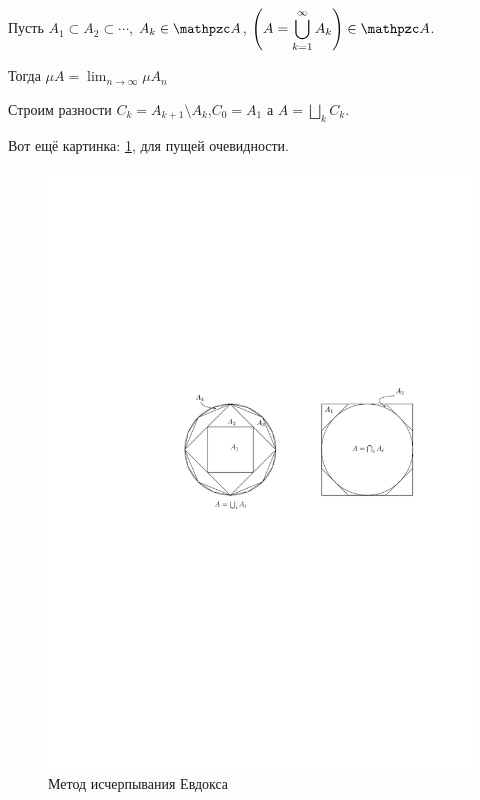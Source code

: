 \documentclass[draft, timbord]{longnotes}
\begin{document}
\begin{prop}\label{prop:meas::meas::bcont}
  Пусть $A_1 \subset A_2 \subset \cdots$, $A_k \in \alg$,
  $\left(\displaystyle A = \bigcup_{k=1}^\infty A_k\right) \in \alg$.
   \par
  Тогда $\displaystyle \mu A = \lim_{n\to \infty} \mu A_n$
\end{prop}
\begin{lproof}
  Строим разности $C_k = A_{k+1} \setminus A_k$,$C_0 = A_1$ а $A= \bigsqcup_k C_k$.
  
  Вот ещё картинка: \ref{fig:meas::meas::eudoks}, для пущей очевидности.

   \begin{figure}
   \begin{center}
     \includegraphics[scale=1]{meas/eudoks}
   \end{center}
   \caption{Метод исчерпывания Евдокса}
   \label{fig:meas::meas::eudoks}
   \end{figure}
   
\end{lproof}
\end{document}

